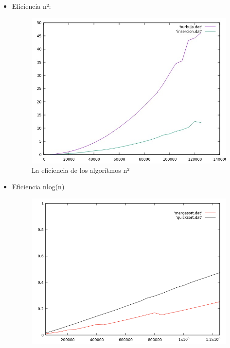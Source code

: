\documentclass[12pt, spanish]{article}
\begin{document}
\begin{itemize}
 \item Eficiencia n²:
  \begin{figure}[H]
    \centering
    \includegraphics[scale = 0.5]{BurbujaInsercion.png}
    \caption{La eficiencia de los algorítmos n²}
  \end{figure}

 \item Eficiencia nlog(n)
   \begin{figure}[H]
    \centering
    \includegraphics[scale = 0.7]{QuicksortMergesort.png}
  \end{figure}


\end{itemize}
\end{document}
